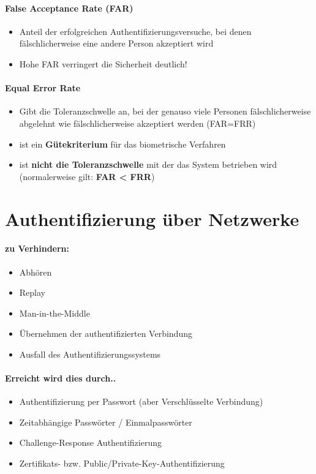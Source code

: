 \paragraph{False Acceptance Rate (FAR)}
\begin{itemize}
	\item Anteil der erfolgreichen
Authentifizierungsversuche, bei denen
fälschlicherweise eine andere Person
akzeptiert wird
	\item Hohe FAR verringert die Sicherheit deutlich!
\end{itemize}

\paragraph{Equal Error Rate}
\begin{itemize}
	\item Gibt die Toleranzschwelle an, bei der genauso viele Personen fälschlicherweise abgelehnt wie
fälschlicherweise akzeptiert werden (FAR=FRR)
	\item ist ein \textbf{Gütekriterium} für das biometrische Verfahren
	\item ist \textbf{nicht die Toleranzschwelle} mit der das System betrieben wird (normalerweise gilt: \textbf{FAR < FRR})
\end{itemize}

\section{Authentifizierung über Netzwerke}
\paragraph{zu Verhindern:}
\begin{itemize}
	\item Abhören
	\item Replay
	\item Man-in-the-Middle
	\item Übernehmen der authentifizierten Verbindung
	\item Ausfall des Authentifizierungssystems
\end{itemize}

\paragraph{Erreicht wird dies durch..}
\begin{itemize}
	\item Authentifizierung per Passwort (aber Verschlüsselte Verbindung)
	\item Zeitabhängige Passwörter / Einmalpasswörter
	\item Challenge-Response Authentifizierung
	\item Zertifikats- bzw. Public/Private-Key-Authentifizierung
\end{itemize}

